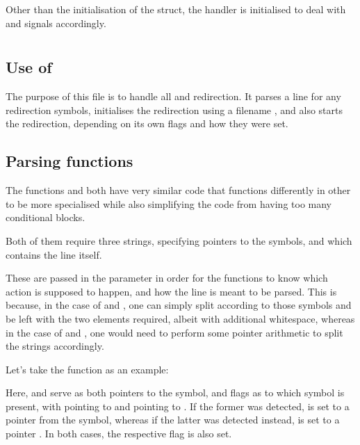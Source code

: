 \documentclass[12pt, a4paper]{report}
\begin{document}
                    Other than the initialisation of the  struct, the
                    handler is initialised to deal with  and 
                    signals accordingly.

        \section{}
            \subsection{Use of }
                The purpose of this file is to handle all  and
                 redirection. It parses a line for any redirection
                symbols, initialises the redirection using a filename
                , and also starts the redirection,
                depending on its own flags and how they were set.
                
            \subsection{Parsing functions}
                The functions  and 
                both have very similar code that functions differently in other
                to be more specialised while also simplifying the code from having
                too many conditional blocks.

                Both of them require three strings,  specifying pointers
                to the symbols, and  which contains the line itself.

                These are passed in the parameter in order for the functions to know
                which action is supposed to happen, and how the line is meant to be
                parsed. This is because, in the case of \tx{<} and \tx{>}, one can 
                simply split according to those symbols and be left with the two
                elements required, albeit with additional whitespace, whereas in the
                case of \tx{<<<} and \tx{>>}, one would need to perform some 
                pointer arithmetic to split the strings accordingly.

                Let's take the  function as an example:

                \begingroup
                \fontsize{10pt}{10pt}\selectfont
                \endgroup
                Here,  and  serve as both pointers to
                the symbol, and flags as to which symbol is present, with
                 pointing to \tx{<<<} and  pointing to
                \tx{<}. If the former was detected,  is set to a pointer
                 from the symbol, whereas if the latter
                was detected instead,  is set to a pointer
                . In both cases, the respective flag is also set.
\end{document}
